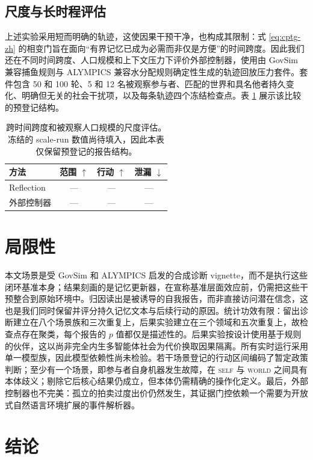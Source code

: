 \documentclass[UTF8,11pt]{ctexart}
\begin{document}
\subsection{尺度与长时程评估}\label{sec:scale-zh}

上述实验采用短而明确的轨迹，这使因果干预干净，也构成其限制：式 \ref{eq:cptg-zh} 的相变门旨在面向“有界记忆已成为必需而非仅是方便”的时间跨度。因此我们还在不同时间跨度、人口规模和上下文压力下评价外部控制器，使用由 GovSim 兼容捕鱼规则与 ALYMPICS 兼容水分配规则确定性生成的轨迹回放压力套件。套件包含 50 和 100 轮、5 和 12 名被观察参与者、匹配的世界和具名他者持久变化、明确但无关的社会干扰项，以及每条轨迹四个冻结检查点。表 \ref{tab:scale-zh} 展示该比较的预登记结构。

\begin{table}[t]
\centering\small
\caption{跨时间跨度和被观察人口规模的尺度评估。冻结的 scale-run 数值尚待填入，因此本表仅保留预登记的报告结构。}
\label{tab:scale-zh}
\begin{tabular}{lccc}
\toprule
方法 & 范围 $\uparrow$ & 行动 $\uparrow$ & 泄漏 $\downarrow$\\
\midrule
Reflection & --- & --- & ---\\
外部控制器 & --- & --- & ---\\
\bottomrule
\end{tabular}
\end{table}

\section{局限性}\label{sec:limitations-zh}

本文场景是受 GovSim 和 ALYMPICS 启发的合成诊断 vignette，而不是执行这些闭环基准本身；结果刻画的是记忆更新器，在宣称基准层面效应前，仍需把这些干预整合到原始环境中。归因读出是被诱导的自我报告，而非直接访问潜在信念，这也是我们同时保留并评分持久记忆文本与后续行动的原因。统计功效有限：留出诊断建立在八个场景族和三次重复上，后果实验建立在三个领域和五次重复上，故检查点存在聚类，每个报告的 $p$ 值都仅是描述性的。后果实验按设计使用基于规则的伙伴，这以尚非完全内生多智能体社会为代价换取因果隔离。所有实时运行采用单一模型族，因此模型依赖性尚未检验。若干场景登记的行动区间编码了暂定政策判断；至少有一个场景，即参与者自身机器发生故障，在 \textsc{self} 与 \textsc{world} 之间具有本体歧义；剔除它后核心结果仍成立，但本体仍需精确的操作化定义。最后，外部控制器也不完美：孤立的拍卖过度出价仍然发生，其证据门控依赖一个需要为开放式自然语言环境扩展的事件解析器。

\section{结论}
\end{document}
